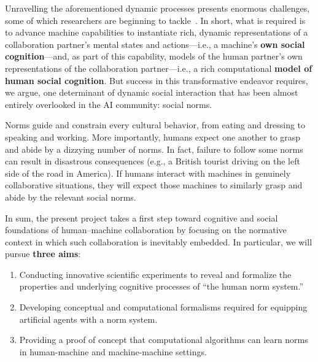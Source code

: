 Unravelling the aforementioned dynamic processes presents enormous
challenges, some of which researchers are beginning to
tackle~\cite{williams_robot_2012,cangelosi_2015}.  In short, what is
required is to advance machine capabilities to instantiate rich,
dynamic representations of a collaboration partner's mental states and
actions---i.e., a machine's {\bf own social cognition}---and, as part
of this capability, models of the human partner's own representations
of the collaboration partner---i.e., a rich computational {\bf model
  of human social cognition}.  But
success in this transformative endeavor requires, we argue, one
determinant of dynamic social interaction that has been almost
entirely overlooked in the AI community: social norms.


Norms guide and constrain every cultural behavior, from eating and
dressing to speaking and working. More importantly, humans expect one
another to grasp and abide by a dizzying number of norms.  In fact,
failure to follow some norms can result in disastrous consequences
(e.g., a British tourist driving on the left side of the road in
America). If humans interact with machines in genuinely collaborative
situations, they will expect those machines to similarly grasp and
abide by the relevant social norms.

In sum, the present project takes a first step toward cognitive and
social foundations of human--machine collaboration by focusing on the
normative context in which such collaboration is inevitably embedded.
In particular, we will pursue {\bf three aims}:

\begin{enumerate}

\item Conducting innovative scientific experiments to reveal and
  formalize the properties and underlying cognitive processes of 
  ``the human norm system.''

\item Developing conceptual and computational formalisms required for
  equipping artificial agents with a norm system.

\item Providing a proof of concept that computational algorithms can
  learn norms in human-machine and machine-machine settings.

\end{enumerate}

